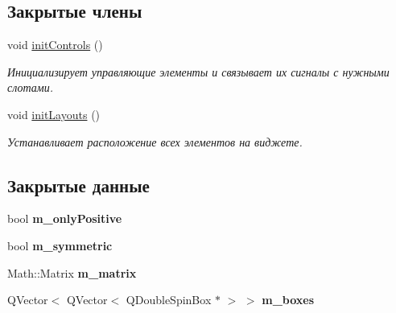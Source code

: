 \subsection*{Закрытые члены}
\begin{DoxyCompactItemize}
\item 
\hypertarget{class_matrix_widget_a9c693e71b54ca95204792160dfe1c4bf}{}\label{class_matrix_widget_a9c693e71b54ca95204792160dfe1c4bf} 
void \hyperlink{class_matrix_widget_a9c693e71b54ca95204792160dfe1c4bf}{init\+Controls} ()
\begin{DoxyCompactList}\small\item\em Инициализирует управляющие элементы и связывает их сигналы с нужными слотами. \end{DoxyCompactList}\item 
\hypertarget{class_matrix_widget_ae3c951130052ad2d93105a98c4468b13}{}\label{class_matrix_widget_ae3c951130052ad2d93105a98c4468b13} 
void \hyperlink{class_matrix_widget_ae3c951130052ad2d93105a98c4468b13}{init\+Layouts} ()
\begin{DoxyCompactList}\small\item\em Устанавливает расположение всех элементов на виджете. \end{DoxyCompactList}\end{DoxyCompactItemize}
\subsection*{Закрытые данные}
\begin{DoxyCompactItemize}
\item 
\hypertarget{class_matrix_widget_a82f2f645dfe6a61844cbcaa7b9d74c5f}{}\label{class_matrix_widget_a82f2f645dfe6a61844cbcaa7b9d74c5f} 
bool {\bfseries m\+\_\+only\+Positive}
\item 
\hypertarget{class_matrix_widget_ad3c5c9a7eb76b52d92ff88e5aac69df8}{}\label{class_matrix_widget_ad3c5c9a7eb76b52d92ff88e5aac69df8} 
bool {\bfseries m\+\_\+symmetric}
\item 
\hypertarget{class_matrix_widget_a45e4733316b0de574c8f333e3f89bd4c}{}\label{class_matrix_widget_a45e4733316b0de574c8f333e3f89bd4c} 
Math\+::\+Matrix {\bfseries m\+\_\+matrix}
\item 
\hypertarget{class_matrix_widget_ab3a0c3c5c847e0a35aa23a6a7e7d56f6}{}\label{class_matrix_widget_ab3a0c3c5c847e0a35aa23a6a7e7d56f6} 
Q\+Vector$<$ Q\+Vector$<$ Q\+Double\+Spin\+Box $\ast$ $>$ $>$ {\bfseries m\+\_\+boxes}
\end{DoxyCompactItemize}


